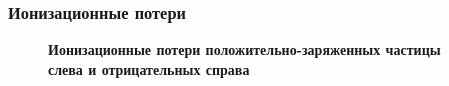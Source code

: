 \documentclass[14pt, hyperref = {colorlinks}]{beamer}
\begin{document}
\begin{frame}
\frametitle{Ионизационные потери}
\begin{figure}[h]
\center\textbf{Ионизационные потери положительно-заряженных частицы слева и отрицательных справа}
 \begin{minipage}[h]{0.49\linewidth}
  \end{minipage}
  \hfill
  \begin{minipage}[h]{0.49\linewidth}
  \end{minipage}
   \small{}
\end{figure}
\end{frame}
\end{document}
